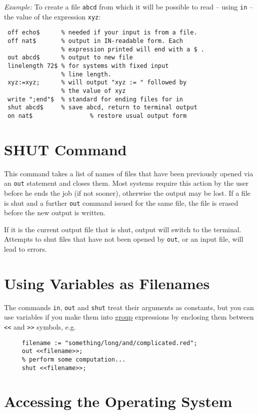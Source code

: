 \textit{Example:} To create a file \texttt{abcd} from which it will be possible
to read -- using \texttt{in} -- the value of the expression \texttt{xyz}:
\begin{verbatim}
 off echo$      % needed if your input is from a file.
 off nat$       % output in IN-readable form. Each
                % expression printed will end with a $ .
 out abcd$      % output to new file
 linelength 72$ % for systems with fixed input
                % line length.
 xyz:=xyz;      % will output "xyz := " followed by
                % the value of xyz
 write ";end"$  % standard for ending files for in
 shut abcd$     % save abcd, return to terminal output
 on nat$                % restore usual output form
\end{verbatim}

\section{SHUT Command}
\hypertarget{command:SHUT}{}
This command takes a list of names of files that have been previously
opened via an \texttt{out} statement and closes them. Most systems require this
action by the user before he ends the {\REDUCE} job (if not sooner),
otherwise the output may be lost. If a file is shut and a further \texttt{out}
command issued for the same file, the file is erased before the new output
is written.

If it is the current output file that is shut, output will switch to the
terminal.  Attempts to shut files that have not been opened by \texttt{out},
or an input file, will lead to errors.

\section{Using Variables as Filenames}

The commands \texttt{in}, \texttt{out} and \texttt{shut} treat their
arguments as constants, but you can use variables if you make them
into \hyperlink{command:GROUP}{group}
 expressions by enclosing them between
\texttt{<}\texttt{<} and \texttt{>}\texttt{>} symbols, e.g.
\begin{verbatim}
     filename := "something/long/and/complicated.red";
     out <<filename>>;
     % perform some computation...
     shut <<filename>>;
\end{verbatim}

\section{Accessing the Operating System}


